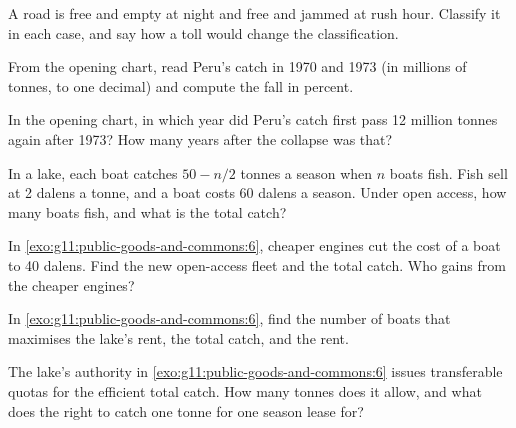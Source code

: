 \begin{exercise}[$\star$]\label{exo:g11:public-goods-and-commons:3}
A road is free and empty at night and free and jammed at rush hour. Classify it in each case, and say how a toll would change the classification.
\end{exercise}

\begin{exercise}[$\star$]\label{exo:g11:public-goods-and-commons:4}
From the opening chart, read Peru's catch in 1970 and 1973 (in millions of tonnes, to one decimal) and compute the fall in percent.
\end{exercise}

\begin{exercise}[$\star$]\label{exo:g11:public-goods-and-commons:5}
In the opening chart, in which year did Peru's catch first pass 12 million tonnes again after 1973? How many years after the collapse was that?
\end{exercise}

\begin{exercise}[$\star\star$]\label{exo:g11:public-goods-and-commons:6}
In a lake, each boat catches $50 - n/2$ tonnes a season when $n$ boats fish. Fish sell at 2 dalens a tonne, and a boat costs 60 dalens a season. Under open access, how
many boats fish, and what is the total catch?
\end{exercise}

\begin{exercise}[$\star\star$]\label{exo:g11:public-goods-and-commons:7}
In \cref{exo:g11:public-goods-and-commons:6}, cheaper engines cut the cost of a boat to 40 dalens. Find the new open-access fleet and the total catch. Who gains from the
cheaper engines?
\end{exercise}

\begin{exercise}[$\star\star$]\label{exo:g11:public-goods-and-commons:8}
In \cref{exo:g11:public-goods-and-commons:6}, find the number of boats that maximises the lake's rent, the total catch, and the rent.
\end{exercise}

\begin{exercise}[$\star\star$]\label{exo:g11:public-goods-and-commons:9}
The lake's authority in \cref{exo:g11:public-goods-and-commons:6} issues transferable quotas for the efficient total catch. How many tonnes does it allow, and what
does the right to catch one tonne for one season lease for?
\end{exercise}

